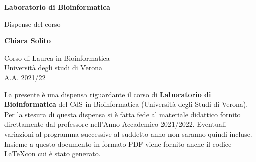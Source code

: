 \documentclass{article}
\begin{document}
\newcommand\tab[1][0.3cm]{\hspace*{#1}}


\begin{titlepage}
    \begin{center}
        \vspace*{1cm}
            
        \Huge
        \textbf{Laboratorio di Bioinformatica}
            
        \vspace{0.5cm}
        \LARGE
        Dispense del corso
            
        \vspace{1.5cm}
            
        \textbf{Chiara Solito}

        \vspace{0.8cm}

            
        \Large
        Corso di Laurea in Bioinformatica\\
        Università degli studi di Verona\\
        A.A. 2021/22
            
    \end{center}
\end{titlepage}
La presente è una dispensa riguardante il corso di \textbf{Laboratorio di Bioinformatica} del CdS in Bioinformatica (Università degli Studi di Verona). Per la stesura di questa dispensa si è fatta fede al materiale didattico fornito direttamente dal professore nell'Anno Accademico 2021/2022. Eventuali variazioni al programma successive al suddetto anno non saranno quindi incluse.\\
Insieme a questo documento in formato PDF viene fornito anche il codice \LaTeX  con cui è stato generato.
\tableofcontents
\thispagestyle{empty}
\newpage
\thispagestyle{empty}
\end{document}
